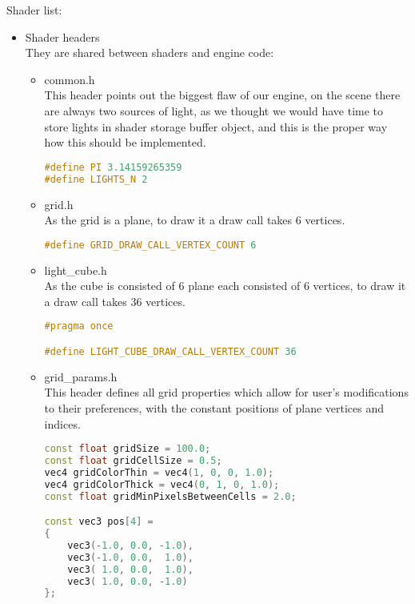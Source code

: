 Shader list:
\begin{itemize}
    \item Shader headers\\
    They are shared between shaders and engine code:
    \begin{itemize}
        \item common.h\\
        This header points out the biggest flaw of our engine, on the scene there are always two sources of light, as we thought we would have time to store lights in shader storage buffer object, and this is the proper way how this should be implemented.
\begin{lstlisting}[language=c++, caption=Common used shader constants(./assets/shaders/common.h)]
#define PI 3.14159265359
#define LIGHTS_N 2
\end{lstlisting}
    \item grid.h\\
    As the grid is a plane, to draw it a draw call takes 6 vertices.
\begin{lstlisting}[language=c++, caption=Grid constant(./assets/shaders/grid.h)]
#define GRID_DRAW_CALL_VERTEX_COUNT 6
\end{lstlisting}
    \item light\_cube.h\\
    As the cube is consisted of 6 plane each consisted of 6 vertices, to draw it a draw call takes 36 vertices.
\begin{lstlisting}[language=c++, caption=Light cubes shader constant(./assets/shaders/light\_cube.h)]
#pragma once

#define LIGHT_CUBE_DRAW_CALL_VERTEX_COUNT 36
\end{lstlisting}
    \item grid\_params.h\\
    This header defines all grid properties which allow for user's modifications to their preferences, with the constant positions of plane vertices and indices.
\begin{lstlisting}[language=c++, caption=Grid shader parameters(./assets/shaders/grid\_params.h)]
const float gridSize = 100.0;
const float gridCellSize = 0.5;
vec4 gridColorThin = vec4(1, 0, 0, 1.0);
vec4 gridColorThick = vec4(0, 1, 0, 1.0);
const float gridMinPixelsBetweenCells = 2.0;

const vec3 pos[4] =
{
    vec3(-1.0, 0.0, -1.0),
    vec3(-1.0, 0.0,  1.0),
    vec3( 1.0, 0.0,  1.0),
    vec3( 1.0, 0.0, -1.0)
};


\end{lstlisting}
\end{itemize}
\end{itemize}
